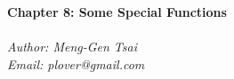\documentclass{article}
\begin{document}
\textbf{\Large Chapter 8: Some Special Functions} \\\\



\emph{Author: Meng-Gen Tsai} \\
\emph{Email: plover@gmail.com} \\\\






\end{document}
